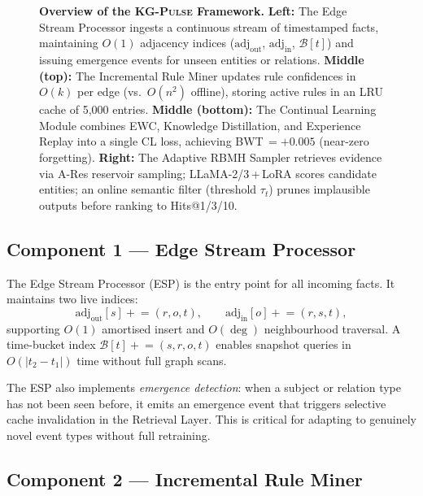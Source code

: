 \documentclass[10pt,a4paper,twocolumn]{article}
\theoremstyle{definition}
\newcommand{\ourmodel}{\textsc{KG-Pulse}}
\newcommand{\calB}{\mathcal{B}}
\begin{document}
\begin{figure}[t]
{\begin{tikzpicture}
\end{tikzpicture}%
}
\caption{%
  \textbf{Overview of the \ourmodel{} Framework.}
  \textbf{Left:} The Edge Stream Processor ingests a continuous stream of
  timestamped facts, maintaining $O(1)$ adjacency indices
  ($\mathrm{adj}_\mathrm{out}$, $\mathrm{adj}_\mathrm{in}$, $\mathcal{B}[t]$)
  and issuing emergence events for unseen entities or relations.
  \textbf{Middle (top):} The Incremental Rule Miner updates rule confidences
  in $O(k)$ per edge (vs.\ $O(n^2)$ offline), storing active rules in an LRU
  cache of 5{,}000 entries.
  \textbf{Middle (bottom):} The Continual Learning Module combines EWC,
  Knowledge Distillation, and Experience Replay into a single CL loss,
  achieving BWT\,$=+0.005$ (near-zero forgetting).
  \textbf{Right:} The Adaptive RBMH Sampler retrieves evidence via
  A-Res reservoir sampling; LLaMA-2/3\,+\,LoRA scores candidate entities;
  an online semantic filter (threshold $\tau_t$) prunes implausible outputs
  before ranking to Hits@1/3/10.
}
\label{fig:architecture}
\end{figure}

\subsection{Component 1 — Edge Stream Processor}
\label{sec:stream}

The Edge Stream Processor (ESP) is the entry point for all incoming facts.
It maintains two live indices:
\[
  \text{adj}_{\mathrm{out}}[s] \mathrel{+}= (r, o, t),\qquad
  \text{adj}_{\mathrm{in}}[o]  \mathrel{+}= (r, s, t),
\]
supporting $O(1)$ amortised insert and $O(\deg)$ neighbourhood traversal.
A time-bucket index $\calB[t] \mathrel{+}= (s,r,o,t)$ enables snapshot
queries in $O(|t_2 - t_1|)$ time without full graph scans.

The ESP also implements \emph{emergence detection}: when a subject or
relation type has not been seen before, it emits an emergence event that
triggers selective cache invalidation in the Retrieval Layer.
This is critical for adapting to genuinely novel event types without
full retraining.

\subsection{Component 2 — Incremental Rule Miner}
\label{sec:incremental_rules}
\end{document}
